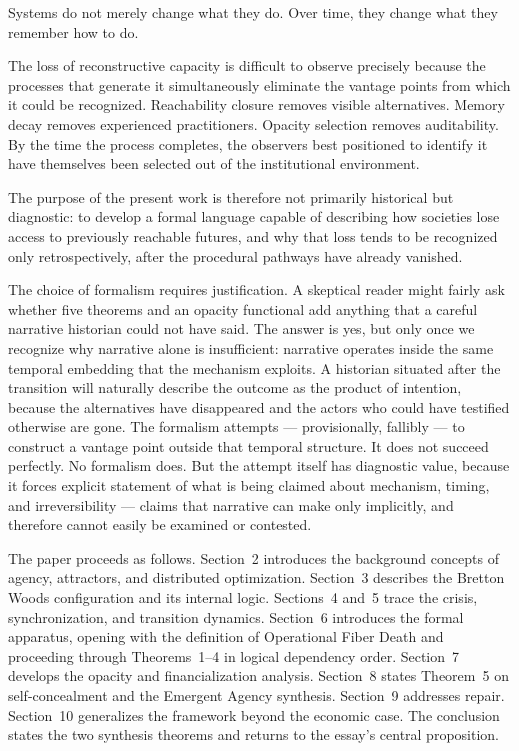 \documentclass[12pt, a4paper]{article}
\theoremstyle{named}
\begin{document}
Systems do not merely change what they do. Over time, they change what
they remember how to do.

The loss of reconstructive capacity is difficult to observe precisely
because the processes that generate it simultaneously eliminate the
vantage points from which it could be recognized. Reachability closure
removes visible alternatives. Memory decay removes experienced
practitioners. Opacity selection removes auditability. By the time the
process completes, the observers best positioned to identify it have
themselves been selected out of the institutional environment.

The purpose of the present work is therefore not primarily historical
but diagnostic: to develop a formal language capable of describing how
societies lose access to previously reachable futures, and why that loss
tends to be recognized only retrospectively, after the procedural
pathways have already vanished.

\medskip

The choice of formalism requires justification. A skeptical reader might
fairly ask whether five theorems and an opacity functional add anything
that a careful narrative historian could not have said. The answer is
yes, but only once we recognize why narrative alone is insufficient:
narrative operates inside the same temporal embedding that the mechanism
exploits. A historian situated after the transition will naturally
describe the outcome as the product of intention, because the
alternatives have disappeared and the actors who could have testified
otherwise are gone. The formalism attempts — provisionally, fallibly —
to construct a vantage point outside that temporal structure. It does
not succeed perfectly. No formalism does. But the attempt itself has
diagnostic value, because it forces explicit statement of what is being
claimed about mechanism, timing, and irreversibility — claims that
narrative can make only implicitly, and therefore cannot easily be
examined or contested.

\medskip

The paper proceeds as follows. Section~2 introduces the background
concepts of agency, attractors, and distributed optimization.
Section~3 describes the Bretton Woods configuration and its internal
logic. Sections~4 and~5 trace the crisis, synchronization, and
transition dynamics. Section~6 introduces the formal apparatus,
opening with the definition of Operational Fiber Death and proceeding
through Theorems~1--4 in logical dependency order. Section~7 develops
the opacity and financialization analysis. Section~8 states Theorem~5
on self-concealment and the Emergent Agency synthesis. Section~9
addresses repair. Section~10 generalizes the framework beyond the
economic case. The conclusion states the two synthesis theorems and
returns to the essay's central proposition.
\end{document}
